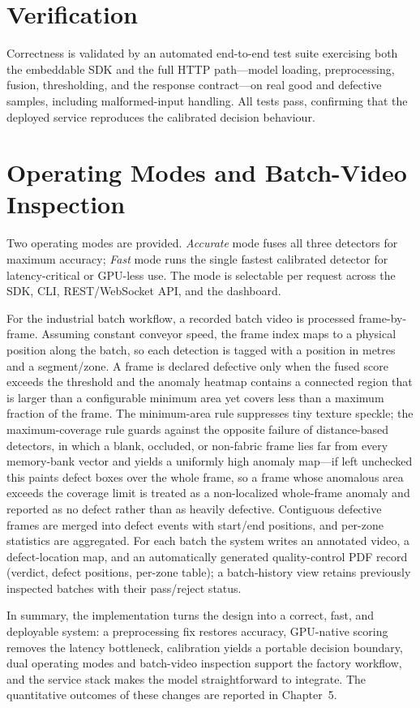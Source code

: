 \section{Verification}

Correctness is validated by an automated end-to-end test suite exercising both the embeddable SDK and the full HTTP path---model loading, preprocessing, fusion, thresholding, and the response contract---on real good and defective samples, including malformed-input handling. All tests pass, confirming that the deployed service reproduces the calibrated decision behaviour.

\section{Operating Modes and Batch-Video Inspection}

Two operating modes are provided. \emph{Accurate} mode fuses all three detectors for maximum accuracy; \emph{Fast} mode runs the single fastest calibrated detector for latency-critical or GPU-less use. The mode is selectable per request across the SDK, CLI, REST/WebSocket API, and the dashboard.

For the industrial batch workflow, a recorded batch video is processed frame-by-frame. Assuming constant conveyor speed, the frame index maps to a physical position along the batch, so each detection is tagged with a position in metres and a segment/zone. A frame is declared defective only when the fused score exceeds the threshold and the anomaly heatmap contains a connected region that is larger than a configurable minimum area yet covers less than a maximum fraction of the frame. The minimum-area rule suppresses tiny texture speckle; the maximum-coverage rule guards against the opposite failure of distance-based detectors, in which a blank, occluded, or non-fabric frame lies far from every memory-bank vector and yields a uniformly high anomaly map---if left unchecked this paints defect boxes over the whole frame, so a frame whose anomalous area exceeds the coverage limit is treated as a non-localized whole-frame anomaly and reported as no defect rather than as heavily defective. Contiguous defective frames are merged into defect events with start/end positions, and per-zone statistics are aggregated. For each batch the system writes an annotated video, a defect-location map, and an automatically generated quality-control PDF record (verdict, defect positions, per-zone table); a batch-history view retains previously inspected batches with their pass/reject status.

In summary, the implementation turns the design into a correct, fast, and deployable system: a preprocessing fix restores accuracy, GPU-native scoring removes the latency bottleneck, calibration yields a portable decision boundary, dual operating modes and batch-video inspection support the factory workflow, and the service stack makes the model straightforward to integrate. The quantitative outcomes of these changes are reported in Chapter~5.

